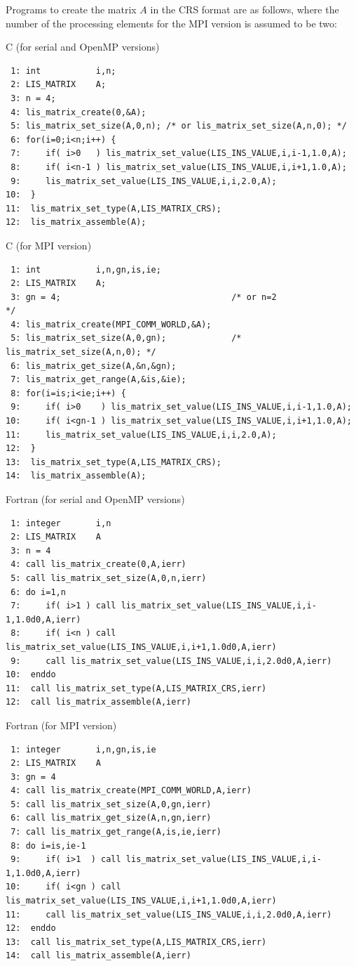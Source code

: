 \documentclass[a4paper]{article}
\begin{document}
Programs to create the matrix $A$ in the CRS format are as follows, 
where the number of the processing elements for the MPI version is assumed to be two:
\begin{itembox}[l]{C (for serial and OpenMP versions)}
\small
\begin{verbatim}
 1: int           i,n;
 2: LIS_MATRIX    A;
 3: n = 4;
 4: lis_matrix_create(0,&A);
 5: lis_matrix_set_size(A,0,n); /* or lis_matrix_set_size(A,n,0); */ 
 6: for(i=0;i<n;i++) {
 7:     if( i>0   ) lis_matrix_set_value(LIS_INS_VALUE,i,i-1,1.0,A);
 8:     if( i<n-1 ) lis_matrix_set_value(LIS_INS_VALUE,i,i+1,1.0,A);
 9:     lis_matrix_set_value(LIS_INS_VALUE,i,i,2.0,A);
10:  }
11:  lis_matrix_set_type(A,LIS_MATRIX_CRS);
12:  lis_matrix_assemble(A);
\end{verbatim}
\end{itembox}
\begin{itembox}[l]{C (for MPI version)}
\small
\begin{verbatim}
 1: int           i,n,gn,is,ie;                 
 2: LIS_MATRIX    A;
 3: gn = 4;                                  /* or n=2                         */
 4: lis_matrix_create(MPI_COMM_WORLD,&A);
 5: lis_matrix_set_size(A,0,gn);             /*    lis_matrix_set_size(A,n,0); */
 6: lis_matrix_get_size(A,&n,&gn);
 7: lis_matrix_get_range(A,&is,&ie);
 8: for(i=is;i<ie;i++) {
 9:     if( i>0    ) lis_matrix_set_value(LIS_INS_VALUE,i,i-1,1.0,A);
10:     if( i<gn-1 ) lis_matrix_set_value(LIS_INS_VALUE,i,i+1,1.0,A);
11:     lis_matrix_set_value(LIS_INS_VALUE,i,i,2.0,A);
12:  }
13:  lis_matrix_set_type(A,LIS_MATRIX_CRS);
14:  lis_matrix_assemble(A);
\end{verbatim}
\end{itembox}
\begin{itembox}[l]{Fortran (for serial and OpenMP versions)}
\small
\begin{verbatim}
 1: integer       i,n
 2: LIS_MATRIX    A
 3: n = 4
 4: call lis_matrix_create(0,A,ierr)
 5: call lis_matrix_set_size(A,0,n,ierr)
 6: do i=1,n
 7:     if( i>1 ) call lis_matrix_set_value(LIS_INS_VALUE,i,i-1,1.0d0,A,ierr)
 8:     if( i<n ) call lis_matrix_set_value(LIS_INS_VALUE,i,i+1,1.0d0,A,ierr)
 9:     call lis_matrix_set_value(LIS_INS_VALUE,i,i,2.0d0,A,ierr)
10:  enddo
11:  call lis_matrix_set_type(A,LIS_MATRIX_CRS,ierr)
12:  call lis_matrix_assemble(A,ierr)
\end{verbatim}
\end{itembox}
\begin{itembox}[l]{Fortran (for MPI version)}
\small
\begin{verbatim}
 1: integer       i,n,gn,is,ie                 
 2: LIS_MATRIX    A
 3: gn = 4
 4: call lis_matrix_create(MPI_COMM_WORLD,A,ierr)
 5: call lis_matrix_set_size(A,0,gn,ierr)
 6: call lis_matrix_get_size(A,n,gn,ierr)
 7: call lis_matrix_get_range(A,is,ie,ierr)
 8: do i=is,ie-1
 9:     if( i>1  ) call lis_matrix_set_value(LIS_INS_VALUE,i,i-1,1.0d0,A,ierr)
10:     if( i<gn ) call lis_matrix_set_value(LIS_INS_VALUE,i,i+1,1.0d0,A,ierr)
11:     call lis_matrix_set_value(LIS_INS_VALUE,i,i,2.0d0,A,ierr)
12:  enddo
13:  call lis_matrix_set_type(A,LIS_MATRIX_CRS,ierr)
14:  call lis_matrix_assemble(A,ierr)
\end{verbatim}
\end{itembox}
\end{document}
